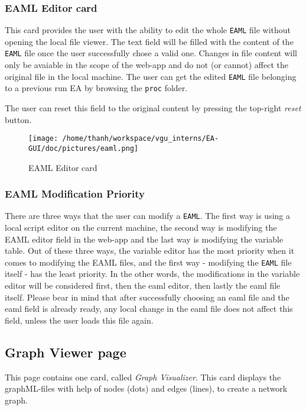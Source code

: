 \documentclass[11pt,a4paper]{article}
\begin{document}
\subsubsection{EAML Editor card}
This card provides the user with the ability to edit the whole \texttt{EAML} file without opening the local file viewer. The text field will be filled with the content of the \texttt{EAML} file once the user successfully chose a valid one. Changes in file content will only be avaiable in the scope of the web-app and do not (or cannot) affect the original file in the local machine. The user can get the edited \texttt{EAML} file belonging to a previous run EA by browsing the \texttt{proc} folder. 

The user can reset this field to the original content by pressing the top-right \textit{reset} button.
\begin{figure}[htp]
\centering
\texttt{[image: /home/thanh/workspace/vgu\_interns/EA-GUI/doc/pictures/eaml.png]}
\caption{EAML Editor card}
\label{}
\end{figure}

\subsubsection*{EAML Modification Priority}
There are three ways that the user can modify a \texttt{EAML}. The first way is using a local script editor on the current machine, the second way is modifying the EAML editor field in the web-app and the last way is modifying the variable table. Out of these three ways, the variable editor has the most priority when it comes to modifying the EAML files, and the first way - modifying the \texttt{EAML} file itself - has the least priority. In the other words, the modifications in the variable editor will be considered first, then the eaml editor, then lastly the eaml file itself. Please bear in mind that after successfully choosing an eaml file and the eaml field is already ready, any local change in the eaml file does not affect this field, unless the user loads this file again.

\subsection{Graph Viewer page}
This page contains one card, called \textit{Graph Visualizer}. This card displays the graphML-files with help of nodes (dots) and edges (lines), to create a network graph.
\end{document}
